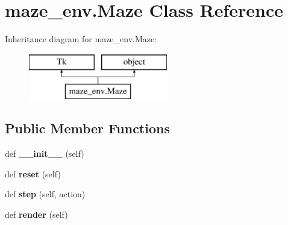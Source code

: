 \hypertarget{classmaze__env_1_1Maze}{}\section{maze\+\_\+env.\+Maze Class Reference}
\label{classmaze__env_1_1Maze}
Inheritance diagram for maze\+\_\+env.\+Maze\+:\begin{figure}[H]
\begin{center}
\leavevmode
\includegraphics[height=2.000000cm]{classmaze__env_1_1Maze}
\end{center}
\end{figure}
\subsection*{Public Member Functions}
\begin{DoxyCompactItemize}
\item 
\mbox{\label{classmaze__env_1_1Maze_ae9866b6b3b070057dd7c9238c6f92c5b}} 
def {\bfseries \+\_\+\+\_\+init\+\_\+\+\_\+} (self)
\item 
\mbox{\label{classmaze__env_1_1Maze_a7fed06d5679e8d5311cb754abf03ba3b}} 
def {\bfseries reset} (self)
\item 
\mbox{\label{classmaze__env_1_1Maze_aa6b347e8b9b1e42507f210c7886861b4}} 
def {\bfseries step} (self, action)
\item 
\mbox{\label{classmaze__env_1_1Maze_a2d25ac5de94ff8e8401248cbd31bc8af}} 
def {\bfseries render} (self)
\end{DoxyCompactItemize}
